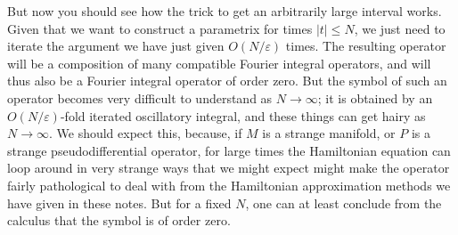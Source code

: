\documentclass{article}
\theoremstyle{plain}
\theoremstyle{remark}
\theoremstyle{definition}
\begin{document}
But now you should see how the trick to get an arbitrarily large interval works. Given that we want to construct a parametrix for times $|t| \leq N$, we just need to iterate the argument we have just given $O(N / \varepsilon)$ times. The resulting operator will be a composition of many compatible Fourier integral operators, and will thus also be a Fourier integral operator of order zero. But the symbol of such an operator becomes very difficult to understand as $N \to \infty$; it is obtained by an $O(N / \varepsilon)$-fold iterated oscillatory integral, and these things can get hairy as $N \to \infty$. We should expect this, because, if $M$ is a strange manifold, or $P$ is a strange pseudodifferential operator, for large times the Hamiltonian equation can loop around in very strange ways that we might expect might make the operator fairly pathological to deal with from the Hamiltonian approximation methods we have given in these notes. But for a fixed $N$, one can at least conclude from the calculus that the symbol is of order zero.





%
%
\end{document}
